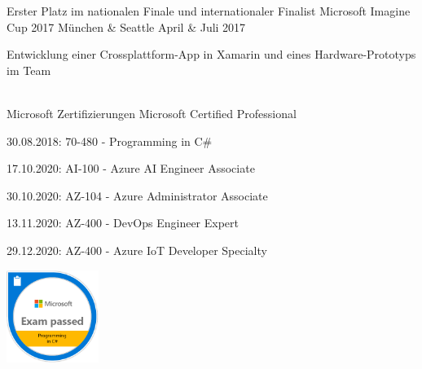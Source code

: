 




\begin{cvhonors}

\cventry
{Erster Platz im nationalen Finale und internationaler Finalist} %
{Microsoft Imagine Cup 2017} %
{München \& Seattle} %
{April \& Juli 2017} %
{ %
\begin{cvitems}
\item {Entwicklung einer Crossplattform-App in Xamarin und eines Hardware-Prototyps im Team}
\end{cvitems}
}
\\
\cventry
{Microsoft Zertifizierungen} %
{Microsoft Certified Professional} %
{} %
{} %
{ %
\begin{cvitems}
    \item {30.08.2018: 70-480 - Programming in C\#}
    \item {17.10.2020: AI-100 - Azure AI Engineer Associate}
    \item {30.10.2020: AZ-104 - Azure Administrator Associate}
    \item {13.11.2020: AZ-400 - DevOps Engineer Expert}
    \item {29.12.2020: AZ-400 - Azure IoT Developer Specialty}

    \item[]{      
          \includegraphics[width=3cm, height=3cm]{Badge70-480.png}
}
\end{cvitems}}
\end{cvhonors}
